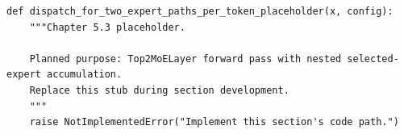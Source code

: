 \begin{lstlisting}[style=bookpython,caption={Planned code placeholder for dispatch for two expert paths per token.},label={lst:ch05-dispatch-for-two-expert-paths-per-token}]
def dispatch_for_two_expert_paths_per_token_placeholder(x, config):
    """Chapter 5.3 placeholder.

    Planned purpose: Top2MoELayer forward pass with nested selected-expert accumulation.
    Replace this stub during section development.
    """
    raise NotImplementedError("Implement this section's code path.")
\end{lstlisting}
